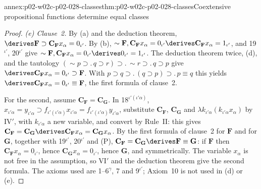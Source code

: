 \begin{annexitem}{annex:p02-w02c-p02-028-classes}{thm:p02-w02c-p02-028-classes}{Coextensive propositional functions determine equal classes}
\begin{proof}
\emph{(e) Clause~2.}  By (a) and the deduction theorem,
\(\derives\mathbf F\supset\mathbf C_{\mathbf F}x_\alpha=0_{\iota'}\).  By (b),
\(\sim\mathbf F,\mathbf C_{\mathbf F}x_\alpha=0_{\iota'}\derives\mathbf C_{\mathbf F}x_\alpha=1_{\iota'}\),
and 19\(^{\iota'}\), 20\(^{\iota'}\) give
\(\sim\mathbf F,\mathbf C_{\mathbf F}x_\alpha=0_{\iota'}\derives0_{\iota'}=1_{\iota'}\).
The deduction theorem twice, (d), and the tautology
\((\sim p\supset.\,q\supset r)\supset.\,\sim r\supset.\,q\supset p\) give
\(\derives\mathbf C_{\mathbf F}x_\alpha=0_{\iota'}\supset\mathbf F\).  With
\(p\supset q\supset.\,(q\supset p)\supset.\,p\equiv q\) this yields
\(\derives\mathbf C_{\mathbf F}x_\alpha=0_{\iota'}\equiv\mathbf F\), the
first formula of clause~2.

For the second, assume \(\mathbf C_{\mathbf F}=\mathbf C_{\mathbf G}\).  In
18\(^{\iota'(\iota'\alpha)}\),
\(x_{\iota'\alpha}=y_{\iota'\alpha}\supset f_{\iota'(\iota'\alpha)}x_{\iota'\alpha}=f_{\iota'(\iota'\alpha)}y_{\iota'\alpha}\),
substitute \(\mathbf C_{\mathbf F}\), \(\mathbf C_{\mathbf G}\) and
\(\lambda k_{\iota'\alpha}(k_{\iota'\alpha}x_\alpha)\) by IV\('\), with
\(k_{\iota'\alpha}\) a new variable, and convert by Rule~II: this gives
\(\mathbf C_{\mathbf F}=\mathbf C_{\mathbf G}\derives\mathbf C_{\mathbf F}x_\alpha=\mathbf C_{\mathbf G}x_\alpha\).
By the first formula of clause~2 for \(\mathbf F\) and for \(\mathbf G\),
together with 19\(^{\iota'}\), 20\(^{\iota'}\) and (P),
\(\mathbf C_{\mathbf F}=\mathbf C_{\mathbf G}\derives\mathbf F\equiv\mathbf G\):
if \(\mathbf F\) then \(\mathbf C_{\mathbf F}x_\alpha=0_{\iota'}\), hence
\(\mathbf C_{\mathbf G}x_\alpha=0_{\iota'}\), hence \(\mathbf G\), and
symmetrically.  The variable \(x_\alpha\) is not free in the assumption, so
VI\('\) and the deduction theorem give the second formula.  The axioms used
are 1--6\(^\gamma\), 7 and 9\(^{\iota'}\); Axiom~10 is not used in (d) or
(e).
\end{proof}
\end{annexitem}

